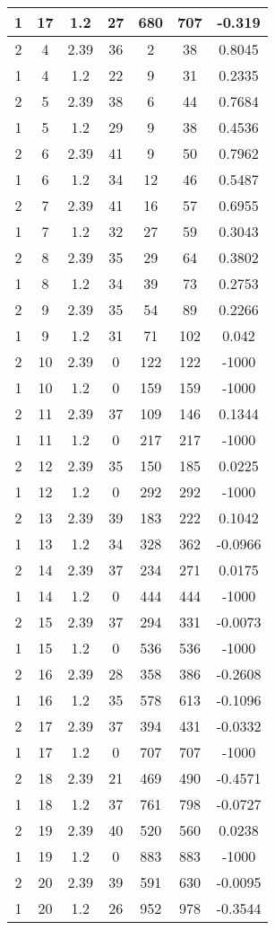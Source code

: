 \documentclass[letterpaper, 12pt]{article}
\begin{document}
\begin{longtable}{|c|c|c|c|c|c|c|}
\hline
1 & 17 & 1.2 & 27 & 680 & 707 & -0.319 \\
\hline
2 & 4 & 2.39 & 36 & 2 & 38 & 0.8045 \\
\hline
1 & 4 & 1.2 & 22 & 9 & 31 & 0.2335 \\
\hline
2 & 5 & 2.39 & 38 & 6 & 44 & 0.7684 \\
\hline
1 & 5 & 1.2 & 29 & 9 & 38 & 0.4536 \\
\hline
2 & 6 & 2.39 & 41 & 9 & 50 & 0.7962 \\
\hline
1 & 6 & 1.2 & 34 & 12 & 46 & 0.5487 \\
\hline
2 & 7 & 2.39 & 41 & 16 & 57 & 0.6955 \\
\hline
1 & 7 & 1.2 & 32 & 27 & 59 & 0.3043 \\
\hline
2 & 8 & 2.39 & 35 & 29 & 64 & 0.3802 \\
\hline
1 & 8 & 1.2 & 34 & 39 & 73 & 0.2753 \\
\hline
2 & 9 & 2.39 & 35 & 54 & 89 & 0.2266 \\
\hline
1 & 9 & 1.2 & 31 & 71 & 102 & 0.042 \\
\hline
2 & 10 & 2.39 & 0 & 122 & 122 & -1000 \\
\hline
1 & 10 & 1.2 & 0 & 159 & 159 & -1000 \\
\hline
2 & 11 & 2.39 & 37 & 109 & 146 & 0.1344 \\
\hline
1 & 11 & 1.2 & 0 & 217 & 217 & -1000 \\
\hline
2 & 12 & 2.39 & 35 & 150 & 185 & 0.0225 \\
\hline
1 & 12 & 1.2 & 0 & 292 & 292 & -1000 \\
\hline
2 & 13 & 2.39 & 39 & 183 & 222 & 0.1042 \\
\hline
1 & 13 & 1.2 & 34 & 328 & 362 & -0.0966 \\
\hline
2 & 14 & 2.39 & 37 & 234 & 271 & 0.0175 \\
\hline
1 & 14 & 1.2 & 0 & 444 & 444 & -1000 \\
\hline
2 & 15 & 2.39 & 37 & 294 & 331 & -0.0073 \\
\hline
1 & 15 & 1.2 & 0 & 536 & 536 & -1000 \\
\hline
2 & 16 & 2.39 & 28 & 358 & 386 & -0.2608 \\
\hline
1 & 16 & 1.2 & 35 & 578 & 613 & -0.1096 \\
\hline
2 & 17 & 2.39 & 37 & 394 & 431 & -0.0332 \\
\hline
1 & 17 & 1.2 & 0 & 707 & 707 & -1000 \\
\hline
2 & 18 & 2.39 & 21 & 469 & 490 & -0.4571 \\
\hline
1 & 18 & 1.2 & 37 & 761 & 798 & -0.0727 \\
\hline
2 & 19 & 2.39 & 40 & 520 & 560 & 0.0238 \\
\hline
1 & 19 & 1.2 & 0 & 883 & 883 & -1000 \\
\hline
2 & 20 & 2.39 & 39 & 591 & 630 & -0.0095 \\
\hline
1 & 20 & 1.2 & 26 & 952 & 978 & -0.3544 \\
\hline
\end{longtable}
\end{document}
